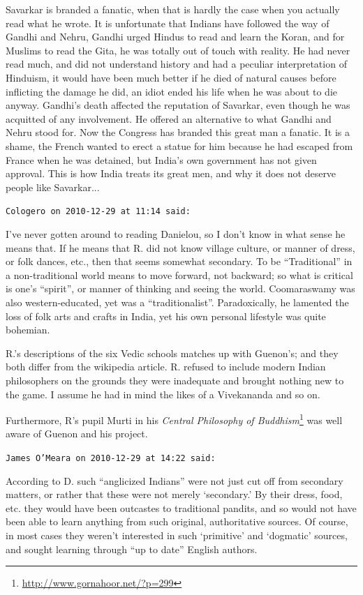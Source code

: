 \begin{footnotesize}
\begin{sffamily}
Savarkar is branded a fanatic, when that is hardly the case when you actually read what he wrote. It is unfortunate that Indians have followed the way of Gandhi and Nehru, Gandhi urged Hindus to read and learn the Koran, and for Muslims to read the Gita, he was totally out of touch with reality. He had never read much, and did not understand history and had a peculiar interpretation of Hinduism, it would have been much better if he died of natural causes before inflicting the damage he did, an idiot ended his life when he was about to die anyway. Gandhi's death affected the reputation of Savarkar, even though he was acquitted of any involvement. He offered an alternative to what Gandhi and Nehru stood for. Now the Congress has branded this great man a fanatic. It is a shame, the French wanted to erect a statue for him because he had escaped from France when he was detained, but India's own government has not given approval. This is how India treats its great men, and why it does not deserve people like Savarkar... 

\hfill

\texttt{Cologero on 2010-12-29 at 11:14 said:}

I've never gotten around to reading Danielou, so I don't know in what sense he means that. If he means that R. did not know village culture, or manner of dress, or folk dances, etc., then that seems somewhat secondary. To be ``Traditional'' in a non-traditional world means to move forward, not backward; so what is critical is one's ``spirit'', or manner of thinking and seeing the world. Coomaraswamy was also western-educated, yet was a ``traditionalist''. Paradoxically, he lamented the loss of folk arts and crafts in India, yet his own personal lifestyle was quite bohemian.

R.'s descriptions of the six Vedic schools matches up with Guenon's; and they both differ from the wikipedia article. R. refused to include modern Indian philosophers on the grounds they were inadequate and brought nothing new to the game. I assume he had in mind the likes of a Vivekananda and so on.

Furthermore, R's pupil Murti in his \textit{Central Philosophy of Buddhism}\footnote{\url{http://www.gornahoor.net/?p=299}} was well aware of Guenon and his project.

\hfill

\texttt{James O'Meara on 2010-12-29 at 14:22 said:}

According to D. such ``anglicized Indians'' were not just cut off from secondary matters, or rather that these were not merely `secondary.' By their dress, food, etc. they would have been outcastes to traditional pandits, and so would not have been able to learn anything from such original, authoritative sources. Of course, in most cases they weren't interested in such `primitive' and `dogmatic' sources, and sought learning through ``up to date'' English authors.


\end{sffamily}
\end{footnotesize}
